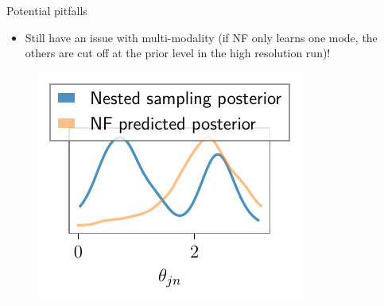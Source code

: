 \documentclass[aspectratio=169, 11pt]{beamer}
\begin{document}


\begin{frame}{Potential pitfalls}
\vspace{2em}
    \begin{itemize}
    \item Still have an issue with multi-modality (if NF only learns one mode, the others are cut off at the prior level in the high resolution run)!
\end{itemize}

    \begin{figure}
        \centering
        \includegraphics[]{Ca_Foscari Beamer/presentation_multimodality.pdf}
    \end{figure}
\end{frame}
\end{document}

